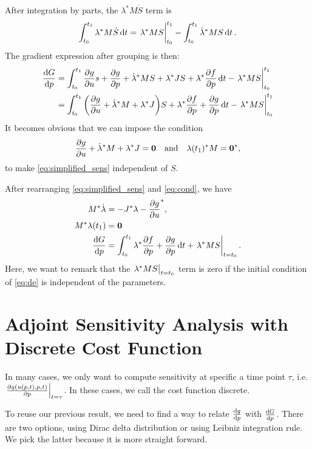 \documentclass[a4paper,9pt]{article}
\theoremstyle{definition}
\theoremstyle{remark}
\begin{document}
After integration by parts, the $\lambda^* M\dot{S}$ term is
\begin{align}
  \int_{t_0}^{t_1} \lambda^* M\dot{S} \dd{t} = \eval{\lambda^* MS}_{t_0}^{t_1} -
  \int_{t_0}^{t_1} \dot{\lambda}^* MS \dd{t}.
\end{align}
The gradient expression after grouping is then:
\begin{align} \label{eq:simplified_sens}
  \dv{G}{p} &= \int_{t_0}^{t_1} \pdv{g}{u}s + \pdv{g}{p}
  + \dot{\lambda}^* MS + \lambda^* JS+ \lambda^* \pdv{f}{p} \dd{t}
              - \eval{\lambda^* MS}_{t_0}^{t_1} \nonumber \\
            &= \int_{t_0}^{t_1} \qty(\pdv{g}{u} + \dot{\lambda}^*M  + \lambda^*
            J)S +\lambda^* \pdv{f}{p}  + \pdv{g}{p} \dd{t}
              - \eval{\lambda^* MS}_{t_0}^{t_1}
\end{align}
It becomes obvious that we can impose the condition
\begin{equation} \label{eq:cond}
  \pdv{g}{u} + \dot{\lambda}^*M + \lambda^* J = \bm{0} \qq{and}
  \lambda(t_1)^* M = \bm{0}^*,
\end{equation}
to make \cref{eq:simplified_sens} independent of $S$.

After rearranging \cref{eq:simplified_sens} and \cref{eq:cond}, we have
\begin{align}
    M^*\dot{\lambda} &= -J^* \lambda - \pdv{g}{u}^*, \label{eq:adj_eq_cont}\\
    M^* \lambda(t_1) &= \bm{0} \label{eq:init_cont}\\
    \dv{G}{p} &= \int_{t_0}^{t_1} \lambda^* \pdv{f}{p}  + \pdv{g}{p} \dd{t}
    + \eval{\lambda^* MS}_{t=t_0}. \label{eq:sens_int}
\end{align}
Here, we want to remark that the $\eval{\lambda^* MS}_{t=t_0}$ term is zero if
the initial condition of \cref{eq:de} is independent of the parameters.

\section{Adjoint Sensitivity Analysis with Discrete Cost Function}
In many cases, we only want to compute sensitivity at specific a time point
$\tau$, i.e. $\eval{\pdv{g(u(p, t), p, t)}{p}}_{t=\tau}$. In these cases, we
call the cost function discrete.

To reuse our previous result, we need to find a way to relate $\dv{g}{p}$ with
$\dv{G}{p}$. There are two options, using Dirac delta distribution or using
Leibniz integration rule. We pick the latter because it is more straight
forward.
\end{document}

